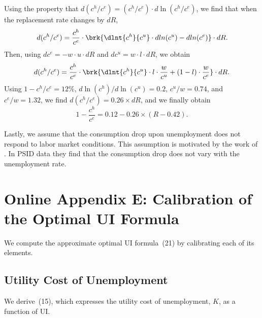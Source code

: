 \documentclass[letterpaper,12pt,leqno]{article}
\begin{document}
Using the property that $d(c^h/c^e) = (c^h/c^e)\cdot d\ln(c^h/c^e)$, we find that when the replacement rate changes by $dR$,
\begin{equation*}
d(c^h/c^e)=\frac{c^h}{c^e}\cdot\brk{\dlnt{c^h}{c^u}\cdot dln(c^u)-dln(c^e)}\cdot dR.
\end{equation*}
Then, using $dc^{e}=-w \cdot u\cdot  dR$ and $dc^{u}=w\cdot l \cdot dR$, we obtain
\begin{equation}
d(c^h/c^e)=\frac{c^h}{c^e}\cdot\brk{\dlnt{c^h}{c^u}\cdot l\cdot \frac{w}{c^u}+(1-l)\cdot\frac{w}{c^e}}\cdot dR.
\label{eq:dchce}\end{equation}
Using $1-c^{h}/c^{e}=12\%$, $d\ln(c^{h})/d\ln(c^{u})=0.2$, $c^{u}/w=0.74$, and $c^e/w=1.32$, we find $d(c^{h}/c^{e}) = 0.26 \times dR$, and we finally obtain
\begin{equation}
1-\frac{c^{h}}{c^{e}}=0.12-0.26\times (R-0.42).
\label{eq:chcer}\end{equation}

Lastly, we assume that the consumption drop upon unemployment does not respond to labor market conditions. This assumption is motivated by the work of \citet{KN10}. In PSID data they find that the consumption drop does not vary with the unemployment rate.

\section{Online Appendix E: Calibration of the Optimal UI Formula}\label{app:formula}

We compute the approximate optimal UI formula~(21) by calibrating each of its elements.

\subsection{Utility Cost of Unemployment}

We derive~(15), which expresses the utility cost of unemployment, $K$, as a function of UI.
\end{document}
